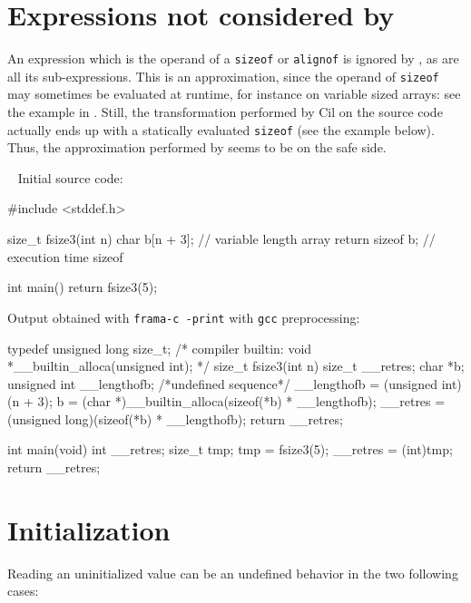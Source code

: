 \section{Expressions not considered by \rte{}}

An expression which is the operand of a \lstinline|sizeof| or \lstinline|alignof|
is ignored by \rte{}, as are all its sub-expressions.  This is an approximation,
since the operand of \lstinline|sizeof| may sometimes be evaluated at runtime,
for instance on variable sized arrays: see the example in .
Still, the transformation performed by Cil on the source code actually ends up
with a statically evaluated \lstinline|sizeof| (see the example below).  Thus,
the approximation performed by \rte{} seems to be on the safe side.

\begin{example} ~
Initial source code:

\begin{listing-nonumber}
#include <stddef.h>

size_t fsize3(int n) {
  char b[n + 3]; // variable length array
  return sizeof b; // execution time sizeof
}

int main() {
  return fsize3(5);
}
\end{listing-nonumber}

Output obtained with \lstinline|frama-c -print| with \lstinline|gcc|
preprocessing:

\begin{listing-nonumber}
typedef unsigned long size_t;
/* compiler builtin:
   void *__builtin_alloca(unsigned int);   */
size_t fsize3(int n)
{
  size_t __retres;
  char *b;
  unsigned int __lengthofb;
  {
    /*undefined sequence*/
    __lengthofb = (unsigned int)(n + 3);
    b = (char *)__builtin_alloca(sizeof(*b) * __lengthofb);
  }
  __retres = (unsigned long)(sizeof(*b) * __lengthofb);
  return __retres;
}

int main(void)
{
  int __retres;
  size_t tmp;
  tmp = fsize3(5);
  __retres = (int)tmp;
  return __retres;
}
\end{listing-nonumber}

\end{example}

\section{Initialization}
\label{sec:initialization}

Reading an uninitialized value can be an undefined behavior in the two following
cases:

